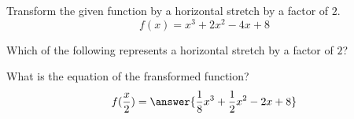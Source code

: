 \documentclass{ximera}
\author{Ivo Terek}
\begin{document}
Transform the given function by a horizontal stretch by a factor of $2$.
\[
f(x)=x^3+2x^2-4x+8
\]
\begin{exercise}
Which of the following represents a horizontal stretch by a factor of $2$?
\begin{multipleChoice}
\end{multipleChoice}
\end{exercise}
\begin{exercise}
What is the equation of the fransformed function?
\[
f(\frac{x}{2})=\answer{\frac{1}{8}x^3+\frac{1}{2}x^2-2x+8}
\]
\end{exercise}
\end{document}
